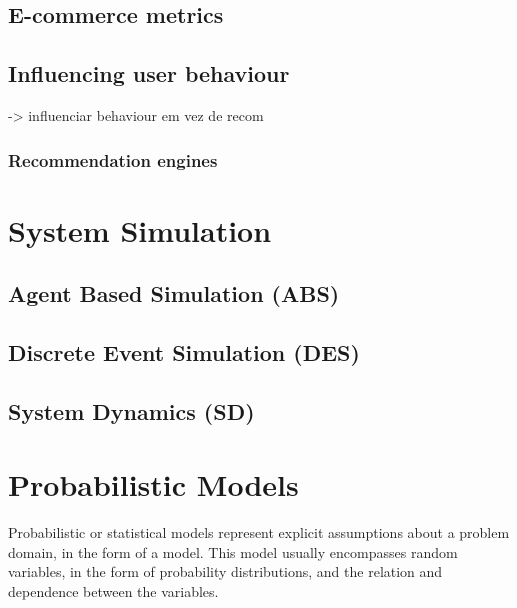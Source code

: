\subsection{E-commerce metrics}

\cite{Sterne2000}

\subsection{Influencing user behaviour}

-> influenciar behaviour em vez de recom

\subsubsection{Recommendation engines}

\cite{Adomavicius2005}

\section{System Simulation}

\subsection{Agent Based Simulation (ABS)}

\cite{Siebers2010}

\subsection{Discrete Event Simulation (DES)}

\cite{Siebers2010}

\subsection{System Dynamics (SD)}

\cite{Siebers2010}

\section{Probabilistic Models}

Probabilistic or statistical models represent explicit assumptions about a problem domain, in the form of a model. This model usually encompasses random variables, in the form of probability distributions, and the relation and dependence between the variables. \cite{Winn2013}

